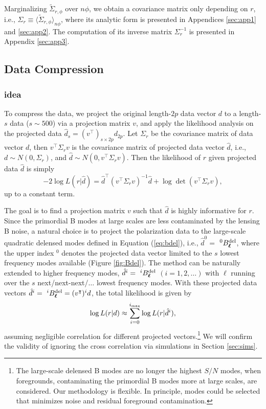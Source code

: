\documentclass[iop,apj, numberedappendix]{emulateapj}
\def\be{\begin{equation}}
\def\ee{\end{equation}}
\newcommand*\Bell{\ensuremath{\boldsymbol\ell}}
\begin{document}
Marginalizing $\tilde \Sigma_{r,\phi}$ over $n\phi$, we obtain a covariance matrix only depending on $r$, i.e.,
$\Sigma_r \equiv \langle \tilde \Sigma_{r,\phi} \rangle_{n\phi}$,
where its analytic form is presented in Appendices \ref{sec:app1} and \ref{sec:app2}.
The computation of its inverse matrix $\Sigma_r^{-1}$ is presented in Appendix \ref{sec:app3}.

\subsection{Data Compression}
\subsubsection{idea}
To compress the data, we project the original length-$2p$ data vector $d$ to
a length-$s$ data ($s\sim 500$) via a projection matrix $v$, and apply the likelihood analysis on the
projected data $\hat d_s = (v^\intercal)_{s\times 2p} d_{2p}$. Let $\Sigma_r$ be the covariance matrix of data vector $d$,
then $v^\intercal\Sigma_r v$ is the covariance matrix of projected data vector $\hat d$, i.e.,
$d\sim N\left(0, \Sigma_r\right)$,
and
$\hat d \sim N\left(0, v^\intercal \Sigma_r v \right)$.
Then the likelihood of $r$ given projected data $\hat d$ is simply
\be
\label{eq:projlikeli}
    -2\log L(r|\hat d)
    = \hat d^\intercal (v^\intercal\Sigma_r v)^{-1} \hat d + \log \det(v^\intercal\Sigma_r v),
\ee
up to a constant term.

The goal is to find a projection matrix $v$ such that $\hat d$ is highly informative for $r$.
Since the primordial B modes at large scales are less contaminated by the lensing B noise,
a natural choice is to project the polarization data to the large-scale quadratic delensed modes
defined in Equation (\ref{eq:bdel}),
i.e., $\hat d^0 =$ $^0B_{\Bell}^{\rm del}$, where the upper index $^0$ denotes the projected data vector
limited to the $s$ lowest frequency  modes available (Figure \ref{fig:Bdel}).
The method can be naturally extended to higher frequency modes,
$\hat d^i = \ ^iB^{\rm del}_{\Bell}$ $(i = 1,2,\dots)$
with $\Bell$ running over the $s$ next/next-next/$\dots$ lowest frequency modes.
With these projected data vectors $\hat d^i = \ ^iB^{\rm del}_{\Bell}= (v^\intercal)^i d$,
the total likelihood is given by
\be
\label{eq:totlikeli}
    \log L(r|d) \approx \sum_{i=0}^{i_{\rm max}}\log L(r|\hat d^i),
\ee
assuming negligible correlation for different projected vectors.\footnote{
The large-scale delensed B modes are no longer the highest $S/N$ modes,
when foregrounds, contaminating the primordial B modes more at large scales, are considered.
Our methodology is flexible. In principle, modes could be selected that
minimizes noise and residual foreground contamination.}
We will confirm the validity of ignoring the cross correlation via simulations in Section \ref{sec:sims}.
\end{document}
